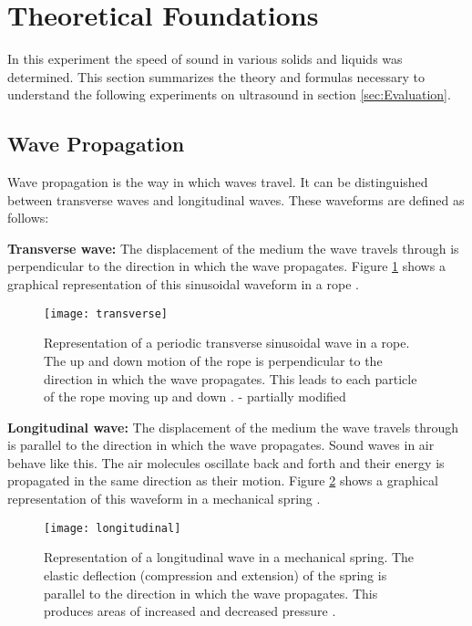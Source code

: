 \section{Theoretical Foundations}
\label{sec:Theoretical_Foundations}
In this experiment the speed of sound in various solids and liquids was determined. This section summarizes the theory and formulas necessary to understand the following experiments on ultrasound in section \ref{sec:Evaluation}.

\subsection{Wave Propagation}
\label{subsec:Wave_Propagation}
Wave propagation is the way in which waves travel. It can be distinguished between transverse waves and longitudinal waves. These waveforms are defined as follows:

\textbf{Transverse wave:} The displacement of the medium the wave travels through is perpendicular to the direction in which the wave propagates. Figure \ref{fig:transverse} shows a graphical representation of this sinusoidal waveform in a rope \cite{waves}.

\begin{figure}[H]
	\centering
	\texttt{[image: transverse]}
	\caption{Representation of a periodic transverse sinusoidal wave in a rope. The up and down motion of the rope is perpendicular to the direction in which the wave propagates. This leads to each particle of the rope moving up and down \cite{waves}. - partially modified}
	\label{fig:transverse}
\end{figure}

\textbf{Longitudinal wave:} The displacement of the medium the wave travels through is parallel to the direction in which the wave propagates. Sound waves in air behave like this. The air molecules oscillate back and forth and their energy is propagated in the same direction as their motion. Figure \ref{fig:longitudinal} shows a graphical representation of this waveform in a mechanical spring \cite{waves}.

\begin{figure}[H]
	\centering
	\texttt{[image: longitudinal]}
	\caption{Representation of a longitudinal wave in a mechanical spring. The elastic deflection (compression and extension) of the spring is parallel to the direction in which the wave propagates. This produces areas of increased and decreased pressure \cite{waves}.}
	\label{fig:longitudinal}
\end{figure}

